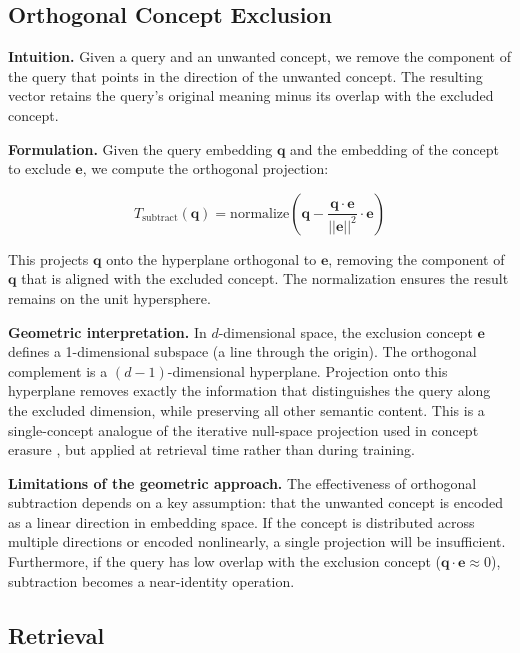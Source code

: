 \documentclass{article}
\begin{document}
\subsection{Orthogonal Concept Exclusion}

\textbf{Intuition.} Given a query and an unwanted concept, we remove the component of the query that points in the direction of the unwanted concept. The resulting vector retains the query's original meaning minus its overlap with the excluded concept.

\textbf{Formulation.} Given the query embedding $\mathbf{q}$ and the embedding of the concept to exclude $\mathbf{e}$, we compute the orthogonal projection:

\begin{equation}
T_{\text{subtract}}(\mathbf{q}) = \text{normalize}\left(\mathbf{q} - \frac{\mathbf{q} \cdot \mathbf{e}}{||\mathbf{e}||^2} \cdot \mathbf{e}\right)
\end{equation}

This projects $\mathbf{q}$ onto the hyperplane orthogonal to $\mathbf{e}$, removing the component of $\mathbf{q}$ that is aligned with the excluded concept. The normalization ensures the result remains on the unit hypersphere.

\textbf{Geometric interpretation.} In $d$-dimensional space, the exclusion concept $\mathbf{e}$ defines a 1-dimensional subspace (a line through the origin). The orthogonal complement is a $(d-1)$-dimensional hyperplane. Projection onto this hyperplane removes exactly the information that distinguishes the query along the excluded dimension, while preserving all other semantic content. This is a single-concept analogue of the iterative null-space projection used in concept erasure \cite{ravfogel2022}, but applied at retrieval time rather than during training.

\textbf{Limitations of the geometric approach.} The effectiveness of orthogonal subtraction depends on a key assumption: that the unwanted concept is encoded as a linear direction in embedding space. If the concept is distributed across multiple directions or encoded nonlinearly, a single projection will be insufficient. Furthermore, if the query has low overlap with the exclusion concept ($\mathbf{q} \cdot \mathbf{e} \approx 0$), subtraction becomes a near-identity operation.

\subsection{Retrieval}
\end{document}
